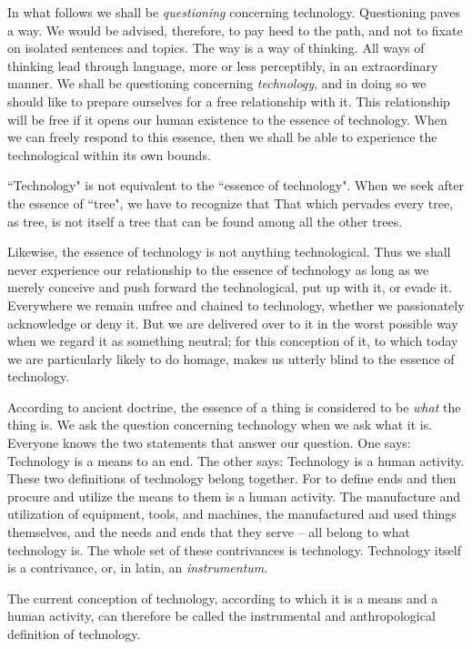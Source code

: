 \documentclass[paper=a4, fontsize=11pt,twoside]{scrartcl}
\begin{document}
\vspace{5.0cm}
In what follows we shall be \textit{questioning} concerning technology. Questioning paves a way. We would be advised, therefore, to pay heed to the path, and not to fixate on isolated sentences and topics. The way is a way of thinking. All ways of thinking lead through language, more or less perceptibly, in an extraordinary manner. We shall be questioning concerning \textit{technology}, and in doing so we should like to prepare ourselves for a free relationship with it. This relationship will be free if it opens our human existence to the essence of technology. When we can freely respond to this essence, then we shall be able to experience the technological within its own bounds.

``Technology" is not equivalent to the ``essence of technology". When we seek after the essence of ``tree", we have to recognize that That which pervades every tree, as tree, is not itself a tree that can be found among all the other trees.

Likewise, the essence of technology is not anything technological. Thus we shall never experience our relationship to the essence of technology as long as we merely conceive and push forward the technological, put up with it, or evade it. Everywhere we remain unfree and chained to technology, whether we passionately acknowledge or deny it. But we are delivered over to it in the worst possible way when we regard it as something neutral; for this conception of it, to which today we are particularly likely to do homage, makes us utterly blind to the essence of technology.

According to ancient doctrine, the essence of a thing is considered to be \textit{what} the thing is. We ask the question concerning technology when we ask what it is. Everyone knows the two statements that answer our question. One says: Technology is a means to an end. The other says: Technology is a human activity. These two definitions of technology belong together. For to define ends and then procure and utilize the means to them is a human activity. The manufacture and utilization of equipment, tools, and machines, the manufactured and used things themselves, and the needs and ends that they serve -- all belong to what technology is. The whole set of these contrivances is technology. Technology itself is a contrivance, or, in latin, an \textit{instrumentum}.

The current conception of technology, according to which it is a means and a human activity, can therefore be called the instrumental and anthropological definition of technology.
\end{document}
